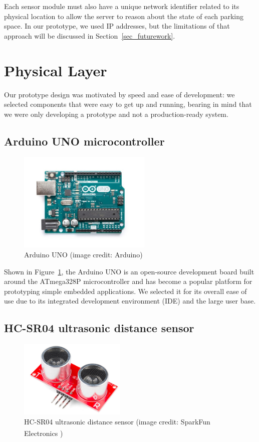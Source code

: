 \documentclass[conference]{IEEEtran}
\begin{document}
Each sensor module must also have a unique network identifier related to its physical location to allow the server to reason about the state of each parking space. In our prototype, we used IP addresses, but the limitations of that approach will be discussed in Section~\ref{sec_futurework}.

\section{Physical Layer}
Our prototype design was motivated by speed and ease of development: we selected components that were easy to get up and running, bearing in mind that we were only developing a prototype and not a production-ready system.

\subsection{Arduino UNO microcontroller}

\begin{figure}[h]
	\centering
	\includegraphics[width=2.5in]{arduinoUNO.jpg}
	\caption{Arduino UNO (image credit: Arduino)}
	\label{fig_arduinoUNO}
\end{figure}

Shown in Figure~\ref{fig_arduinoUNO}, the Arduino UNO is an open-source development board built around the ATmega328P microcontroller and has become a popular platform for prototyping simple embedded applications. We selected it for its overall ease of use due to its integrated development environment (IDE) and the large user base.

\subsection{HC-SR04 ultrasonic distance sensor}

\begin{figure}[h]
	\centering
	\includegraphics[width=2.0in]{hcsr04.png}
	\caption{HC-SR04 ultrasonic distance sensor (image credit: SparkFun Electronics \textsuperscript{\textregistered})}
	\label{fig_hcsr04}
\end{figure}
\end{document}
